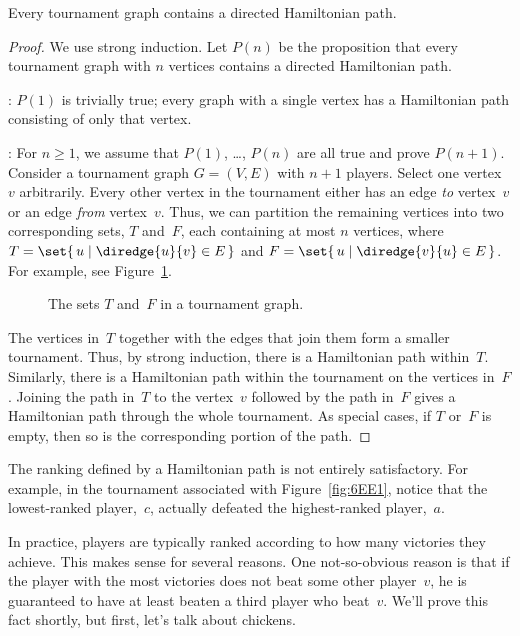 \begin{theorem}\label{thm:hamilton_tournament}
Every tournament graph contains a directed Hamiltonian path.
\end{theorem}

\begin{proof}

We use strong induction.  Let $P(n)$ be the proposition that every
tournament graph with $n$ vertices contains a directed Hamiltonian
path.

: $P(1)$ is trivially true; every graph with
a single vertex has a Hamiltonian path consisting of only that vertex.

: For $n \ge 1$, we assume that $P(1)$,
\dots, $P(n)$ are all true and prove $P(n + 1)$.  Consider a
tournament graph $G = (V, E)$ with $n + 1$ players.  Select one
vertex~$v$ arbitrarily.  Every other vertex in the tournament either
has an edge \emph{to} vertex~$v$ or an edge \emph{from} vertex~$v$.
Thus, we can partition the remaining vertices into two corresponding
sets, $T$ and~$F$, each containing at most $n$ vertices, where $T =
\set{\, u \mid \diredge{u}{v} \in E \,}$ and
$F = \set{\, u \mid \diredge{v}{u} \in E \,}$.
For example, see Figure~\ref{fig:6EE2}.

\begin{figure}


\caption{The sets $T$ and~$F$ in a tournament graph.}

\label{fig:6EE2}

\end{figure}

The vertices in~$T$ together with the edges that join them form a
smaller tournament.  Thus, by strong induction, there is a Hamiltonian
path within~$T$.  Similarly, there is a Hamiltonian path within the
tournament on the vertices in~$F$.  Joining the path in~$T$ to the
vertex~$v$ followed by the path in~$F$ gives a Hamiltonian path
through the whole tournament.  As special cases, if $T$ or~$F$ is
empty, then so is the corresponding portion of the path.
\end{proof}

The ranking defined by a Hamiltonian path is not entirely
satisfactory.  For example, in the tournament associated with
Figure~\ref{fig:6EE1}, notice that the lowest-ranked player,~$c$,
actually defeated the highest-ranked player,~$a$.

In practice, players are typically ranked according to how many
victories they achieve.  This makes sense for several reasons.  One
not-so-obvious reason is that if the player with the most victories
does not beat some other player~$v$, he is guaranteed to have at least
beaten a third player who beat~$v$.  We'll prove this fact shortly,
but first, let's talk about chickens.

